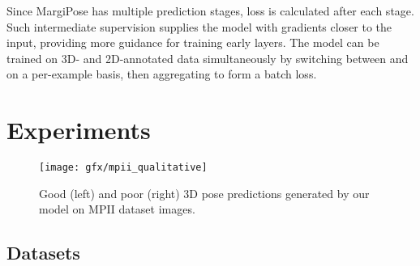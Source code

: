 \documentclass[australian,10pt,twocolumn,letterpaper,twocolumn]{article}
\newcommand{\ourmodel}{MargiPose}
\begin{document}
Since \ourmodel{} has multiple prediction stages, loss is calculated
after each stage. Such intermediate supervision supplies the model
with gradients closer to the input, providing more guidance for training
early layers. The model can be trained on 3D- and 2D-annotated data
simultaneously by switching between  and 
on a per-example basis, then aggregating to form a batch loss.

\section{Experiments}

\begin{figure*}
\begin{centering}
\texttt{[image: gfx/mpii\_qualitative]}
\par\end{centering}
\caption{\label{fig:mpii_qualitative}Good (left) and poor (right) 3D pose
predictions generated by our model on MPII dataset images.}
\end{figure*}

\subsection{Datasets}
\end{document}
